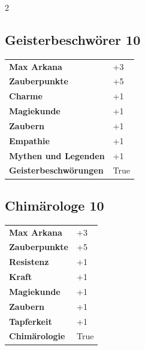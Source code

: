 \begin{multicols}{2}
\begin{tcolorbox}

\end{tcolorbox}

\begin{tcolorbox}
    \subsection*{Geisterbeschwörer \hfill \small{10 }}
    \tcblower




\begin{tabular}{@{}ll@{}}
    \textbf{Max Arkana} & +3\\
    \textbf{Zauberpunkte} & +5\\
    \textbf{Charme} & +1\\
    \textbf{Magiekunde} & +1\\
    \textbf{Zaubern} & +1\\
    \textbf{Empathie} & +1\\
    \textbf{Mythen und Legenden} & +1\\
    \textbf{Geisterbeschwörungen} & True\\
\end{tabular}


\end{tcolorbox}

\begin{tcolorbox}
    \subsection*{Chimärologe \hfill \small{10 }}
    \tcblower




\begin{tabular}{@{}ll@{}}
    \textbf{Max Arkana} & +3\\
    \textbf{Zauberpunkte} & +5\\
    \textbf{Resistenz} & +1\\
    \textbf{Kraft} & +1\\
    \textbf{Magiekunde} & +1\\
    \textbf{Zaubern} & +1\\
    \textbf{Tapferkeit} & +1\\
    \textbf{Chimärologie} & True\\
\end{tabular}


\end{tcolorbox}
\end{multicols}
